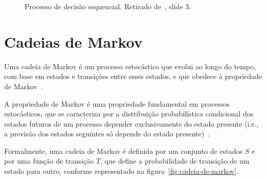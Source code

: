 \begin{figure}[H]
    \begin{center}
    \end{center}
    \caption{Processo de decisão sequencial.
    Retirado de~\cite{isel:iasa:slides:processos-decisao-sequencial}, slide 3.}
    \label{fig:processo-decisao-sequencial}
\end{figure}


\section{Cadeias de Markov}\label{sec:cadeias-de-markov}

Uma cadeia de Markov é um processo estocástico que evolui ao longo do tempo, com
base em estados e transições entre esses estados, e que obedece à propriedade de Markov~\cite{isel:iasa:slides:processos-decisao-sequencial}.

A propriedade de Markov é uma propriedade fundamental em processos estocásticos, que se caracteriza por a distribuição probabilística condicional dos estados futuros de um processo depender exclusivamente do estado presente (i.e., a previsão dos estados seguintes só depende do estado presente)~\cite{isel:iasa:slides:processos-decisao-sequencial}.

Formalmente, uma cadeia de Markov é definida por um conjunto de estados $S$ e por uma função de transição $T$, que define a probabilidade de transição de um estado para outro,
conforme representado na figura~\ref{fig:cadeia-de-markov}.

